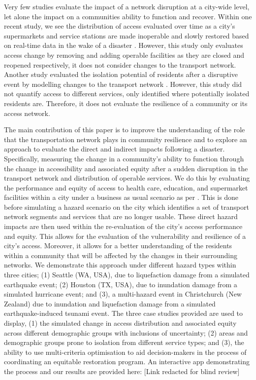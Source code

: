 \documentclass[review,3p,times,onecolumn,sort&compress,12pt]{elsarticle}
\let \cite \parencite
\begin{document}
Very few studies evaluate the impact of a network disruption at a city-wide level, let alone the impact on a communities ability to function and recover.
Within one recent study, we see the distribution of access evaluated over time as a city's supermarkets and service stations are made inoperable and slowly restored based on real-time data in the wake of a disaster \cite{logan2020reframing}.
However, this study only evaluates access change by removing and adding operable facilities as they are closed and reopened respectively, it does not consider changes to the transport network.
Another study evaluated the isolation potential of residents after a disruptive event by modelling changes to the transport network \cite{Bono2011-dk}. 
However, this study did not quantify access to different services, only identified where potentially isolated residents are. Therefore, it does not evaluate the resilience of a community or its access network.

The main contribution of this paper is to improve the understanding of the role that the transportation network plays in community resilience and to explore an approach to evaluate the direct and indirect impacts following a disaster.
Specifically, measuring the change in a community's ability to function through the change in accessibility and associated equity after a sudden disruption in the transport network and distribution of operable services.
We do this by evaluating the performance and equity of access to health care, education, and supermarket facilities within a city under a business as usual scenario as per \textcite{Logan2021-ineq}.
This is done before simulating a hazard scenario on the city which identifies a set of transport network segments and services that are no longer usable.
These direct hazard impacts are then used within the re-evaluation of the city's access performance and equity.
This allows for the evaluation of the vulnerability and resilience of a city's access.
Moreover, it allows for a better understanding of the residents within a community that will be affected by the changes in their surrounding networks.
We demonstrate this approach under different hazard types within three cities; (1) Seattle (WA, USA), due to liquefaction damage from a simulated earthquake event; (2) Houston (TX, USA), due to inundation damage from a simulated hurricane event; and (3), a multi-hazard event in Christchurch (New Zealand) due to inundation and liquefaction damage from a simulated earthquake-induced tsunami event.
The three case studies provided are used to display, (1) the simulated change in access distribution and associated equity across different demographic groups with inclusions of uncertainty; (2) areas and demographic groups prone to isolation from different service types; and (3), the ability to use multi-criteria optimisation to aid decision-makers in the process of coordinating an equitable restoration program.
An interactive app demonstrating the process and our results are provided here: [Link redacted for blind review]
\end{document}
